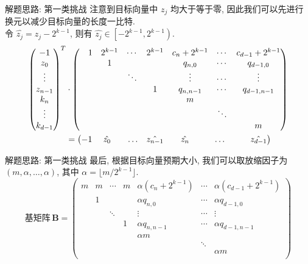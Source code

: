 \documentclass[10pt,compress]{beamer}
\newcommand{\mat}[1]{\mathbf{#1}\xspace}
\begin{document}
\begin{frame}{解题思路: 第一类挑战}
  注意到目标向量中 $z_j$ 均大于等于零, 因此我们可以先进行换元以减少目标向量的长度一比特.\\
  \pause
  令 $\hat{z_j} = z_j - 2^{k-1}$, 则有 $\hat{z_j} \in \left[-2^{k-1}, 2^{k-1}\right)$.
  \medbreak
  \pause
  $$
  \begin{aligned}
    \begin{pmatrix}
      -1 \\ z_0 \\ \vdots \\ z_{n-1} \\ k_n \\ \vdots \\ k_{d-1}
    \end{pmatrix}^T
    &\cdot
    \begin{pmatrix}
      \quad 1 &2^{k-1} &\cdots &2^{k-1} &c_n+2^{k-1} &\cdots &c_{d-1}+2^{k-1} \\
      &1 & & &q_{n,0} &\cdots &q_{d-1,0} \\
      & &\ddots & &\vdots &\cdots &\vdots \\
      & & &1 &q_{n,n-1} &\cdots &q_{d-1,n-1} \\
      & & & &m & & \\
      & & & & &\ddots & \\
      & & & & & &m \\
    \end{pmatrix} \\
    &=
    \begin{pmatrix}
      -1 &\;\hat{z_0} &\quad\ldots &\space\hat{z_{n-1}} &\quad\hat{z_n} &\qquad\ldots &\qquad \hat{z_{d-1}}
    \end{pmatrix}
  \end{aligned}
  $$
\end{frame}

\begin{frame}{解题思路: 第一类挑战}
  最后, 根据目标向量预期大小, 我们可以取放缩因子为 $(m, \alpha, \ldots, \alpha)$, 其中 $\alpha = \lfloor m/2^{k-1}\rfloor$.
  \medbreak
  \pause
  $$
  \text{基矩阵}\, \mat{B} =
  \begin{pmatrix}
    m &m &\cdots &m &\alpha\left(c_n+2^{k-1}\right) &\cdots &\alpha\left(c_{d-1}+2^{k-1}\right) \\
    &1 & & &\alpha q_{n,0} &\cdots &\alpha q_{d-1,0} \\
    & &\ddots & &\vdots &\cdots &\vdots \\
    & & &1 &\alpha q_{n,n-1} &\cdots &\alpha q_{d-1,n-1} \\
    & & & &\alpha m & & \\
    & & & & &\ddots & \\
    & & & & & &\alpha m \\
  \end{pmatrix}
  $$
\end{frame}
\end{document}
